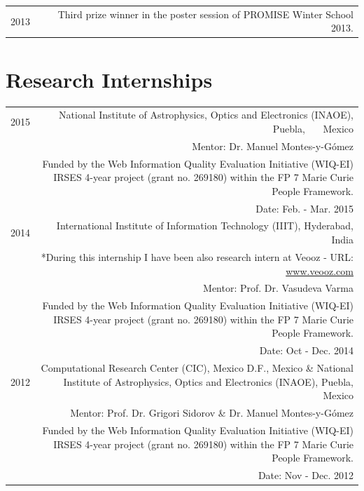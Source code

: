\documentclass[10pt]{article}
\begin{document}
       \begin{tabular}{L!{\VRule}R}
	2013 & Third prize winner in the poster session of PROMISE Winter School 2013.\vspace{5pt}\\
\end{tabular}

\section*{Research Internships}
\begin{tabular}{L!{\VRule}R}
	2015&National Institute of Astrophysics, Optics and Electronics (INAOE), Puebla, ~~~Mexico\\
	&\scriptsize{Mentor: Dr. Manuel Montes-y-G{\'o}mez}\\          
	&\scriptsize{Funded by the  Web Information Quality Evaluation Initiative (WIQ-EI) IRSES 4-year project (grant no. 269180) within the FP 7 Marie Curie People Framework.}\\
	&\scriptsize{Date: Feb. - Mar. 2015}\vspace{5pt}\\
	2014&International Institute of Information Technology (IIIT), Hyderabad, India\\
	&\scriptsize{*During this internship I have been also research intern at Veooz - URL: \url{www.veooz.com} }\\
	&\scriptsize{Mentor: Prof. Dr. Vasudeva Varma}\\          
	&\scriptsize{Funded by the  Web Information Quality Evaluation Initiative (WIQ-EI) IRSES 4-year project (grant no. 269180) within the FP 7 Marie Curie People Framework.}\\
	&\scriptsize{Date: Oct - Dec. 2014}\vspace{5pt}\\
	2012&Computational Research Center (CIC), Mexico D.F., Mexico \& National Institute of Astrophysics, Optics and Electronics (INAOE), Puebla, Mexico\\
	&\scriptsize{Mentor: Prof. Dr. Grigori Sidorov \& Dr. Manuel Montes-y-G{\'o}mez}\\         
	&\scriptsize{Funded by the  Web Information Quality Evaluation Initiative (WIQ-EI) IRSES 4-year project (grant no. 269180) within the FP 7 Marie Curie People Framework.}\\
	&\scriptsize{Date: Nov - Dec. 2012}\vspace{5pt}\\
\end{tabular}
\end{document}
